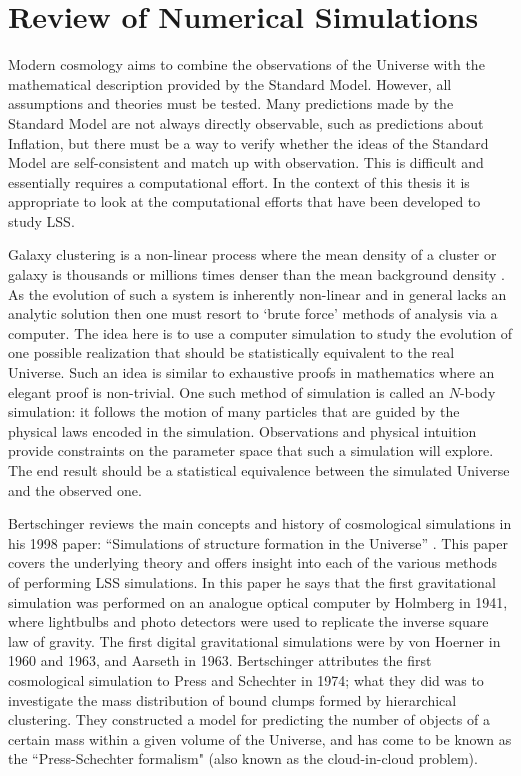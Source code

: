 \chapter{Review of Numerical Simulations}
\label{ch_2}
Modern cosmology aims to combine the observations of the Universe with the mathematical description provided by the Standard Model. However, all assumptions and theories must be tested. Many predictions made by the Standard Model are not always directly observable, such as predictions about Inflation, but there must be a way to verify whether the ideas of the Standard Model are self-consistent and match up with observation. This is difficult and essentially requires a computational effort. In the context of this thesis it is appropriate to look at the computational efforts that have been developed to study LSS.

Galaxy clustering is a non-linear process where the mean density of a cluster or galaxy is thousands or millions times denser than the mean background density \citep{bib_pea}. As the evolution of such a system is inherently non-linear and in general lacks an analytic solution then one must resort to `brute force' methods of analysis via a computer. The idea here is to use a computer simulation to study the evolution of one possible realization that should be statistically equivalent to the real Universe. Such an idea is similar to exhaustive proofs in mathematics where an elegant proof is non-trivial. One such method of simulation is called an $N$-body simulation: it follows the motion of many particles that are guided by the physical laws encoded in the simulation. Observations and physical intuition provide constraints on the parameter space that such a simulation will explore. The end result should be a statistical equivalence between the simulated Universe and the observed one.

Bertschinger reviews the main concepts and history of cosmological simulations in his 1998 paper: ``Simulations of structure formation in the Universe'' \citep{bib_bert}. This paper covers the underlying theory and offers insight into each of the various methods of performing LSS simulations. In this paper he says that the first gravitational simulation was performed on an analogue optical computer by Holmberg in 1941, where lightbulbs and photo detectors were used to replicate the inverse square law of gravity. The first digital gravitational simulations were by von Hoerner in 1960 and 1963, and Aarseth in 1963. Bertschinger attributes the first cosmological simulation to Press and Schechter in 1974; what they did was to investigate the mass distribution of bound clumps formed by hierarchical clustering. They constructed a model for predicting the number of objects of a certain mass within a given volume of the Universe, and has come to be known as the ``Press-Schechter formalism" \citep{bib_pres} (also known as the cloud-in-cloud problem).


